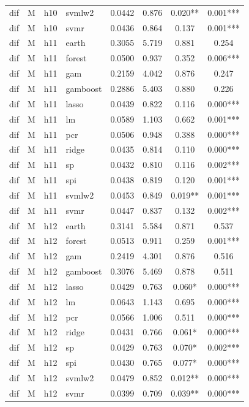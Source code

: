 \begin{ThreePartTable}
\begin{longtable}[t]{llclcccc}
dif & M & h10 & svmlw2 & 0.0442 & 0.876 & 0.020** & 0.001***\\
dif & M & h10 & svmr & 0.0436 & 0.864 & 0.137 & 0.001***\\
\addlinespace
dif & M & h11 & earth & 0.3055 & 5.719 & 0.881 & 0.254\\
dif & M & h11 & forest & 0.0500 & 0.937 & 0.352 & 0.006***\\
dif & M & h11 & gam & 0.2159 & 4.042 & 0.876 & 0.247\\
dif & M & h11 & gamboost & 0.2886 & 5.403 & 0.880 & 0.226\\
dif & M & h11 & lasso & 0.0439 & 0.822 & 0.116 & 0.000***\\
dif & M & h11 & lm & 0.0589 & 1.103 & 0.662 & 0.001***\\
dif & M & h11 & pcr & 0.0506 & 0.948 & 0.388 & 0.000***\\
dif & M & h11 & ridge & 0.0435 & 0.814 & 0.110 & 0.000***\\
dif & M & h11 & sp & 0.0432 & 0.810 & 0.116 & 0.002***\\
dif & M & h11 & spi & 0.0438 & 0.819 & 0.120 & 0.001***\\
dif & M & h11 & svmlw2 & 0.0453 & 0.849 & 0.019** & 0.001***\\
dif & M & h11 & svmr & 0.0447 & 0.837 & 0.132 & 0.002***\\
\addlinespace
dif & M & h12 & earth & 0.3141 & 5.584 & 0.871 & 0.537\\
dif & M & h12 & forest & 0.0513 & 0.911 & 0.259 & 0.001***\\
dif & M & h12 & gam & 0.2419 & 4.301 & 0.876 & 0.516\\
dif & M & h12 & gamboost & 0.3076 & 5.469 & 0.878 & 0.511\\
dif & M & h12 & lasso & 0.0429 & 0.763 & 0.060* & 0.000***\\
dif & M & h12 & lm & 0.0643 & 1.143 & 0.695 & 0.000***\\
dif & M & h12 & pcr & 0.0566 & 1.006 & 0.511 & 0.000***\\
dif & M & h12 & ridge & 0.0431 & 0.766 & 0.061* & 0.000***\\
dif & M & h12 & sp & 0.0429 & 0.763 & 0.070* & 0.002***\\
dif & M & h12 & spi & 0.0430 & 0.765 & 0.077* & 0.000***\\
dif & M & h12 & svmlw2 & 0.0479 & 0.852 & 0.012** & 0.000***\\
dif & M & h12 & svmr & 0.0399 & 0.709 & 0.039** & 0.000***\\

\end{longtable}
\end{ThreePartTable}
